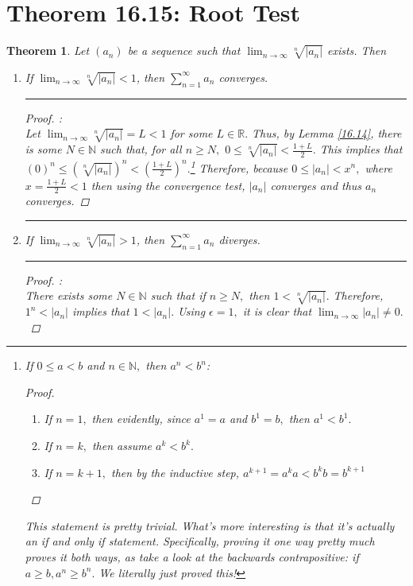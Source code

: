 \documentclass[openany, amssymb, psamsfonts]{amsart}
\newcommand{\bbN}{\mathbb{N}}
\newcommand{\bbR}{\mathbb{R}}
\newcommand{\abs}[1]{\lvert #1 \rvert}
\newtheorem{thm}{Theorem}[section]
\theoremstyle{definition}
\numberwithin{equation}{section}
\begin{document}
\section*{Theorem 16.15: Root Test}
\begin{thm}
\label{16.15}
	Let $(a_n)$ be a sequence such that $\displaystyle\lim_{n \to \infty} \sqrt[n]{\abs{a_n}}$ exists.  Then
	\begin{enumerate}
		\item[a)] If $\displaystyle\lim_{n \to \infty} \sqrt[n]{\abs{a_n}} < 1$,
		then $\displaystyle\sum_{n = 1}^{\infty} a_n$ converges.
\vspace{4pt}     \hrule   \vspace{4pt}\begin{proof}:\\
Let $\displaystyle\lim_{n\to\infty} \sqrt[n]{\abs{a_n}}= L <1$ for some $L \in \bbR.$ Thus, by Lemma \ref{16.14}, there is some $N \in \bbN$ such that, for all $n\geq N,$ $0\leq \sqrt[n]{\abs{a_n}} < \frac{1+L}{2}.$ This implies that $(0)^n \leq (\sqrt[n]{\abs{a_n}})^n < (\frac{1+L}{2})^n.$\footnote{If $0\leq a<b$ and $n \in \bbN,$ then $a^n<b^n$: 
\begin{proof}
\begin{enumerate}
    \item If $n = 1,$ then evidently, since $a^1 = a$ and $b^1 = b,$ then $a^1<b^1.$
    \item If $n = k,$ then assume $a^k < b^k.$
    \item If $n = k+1,$ then by the inductive step, $a^{k+1} = a^ka<b^kb = b^{k+1}$
\end{enumerate}
\end{proof} This statement is pretty trivial. What's more interesting is that it's actually an if and only if statement. Specifically, proving it one way pretty much proves it both ways, as take a look at the backwards contrapositive: if $a\geq b,a^n\geq b^n.$ We literally just proved this!} Therefore, because $0\leq |a_n|< x^n,$ where $x = \frac{1+L}{2}<1$ then using the convergence test, $|a_n|$ converges and thus $a_n$ converges. 
\end{proof}\vspace{4pt}     \hrule   \vspace{4pt}
		\item[b)] If $
		\displaystyle\lim_{n \to \infty} \sqrt[n]{\abs{a_n}} > 1$,
		then $\displaystyle\sum_{n = 1}^{\infty} a_n$ diverges.
\vspace{4pt}     \hrule   \vspace{4pt}\begin{proof}:\\
    There exists some $N \in \bbN$ such that if $n\geq N,$ then $1< \sqrt[n]{\abs{a_n}}.$ Therefore, $1^n < \abs{a_n}$ implies that $1< \abs {a_n}.$ Using $\epsilon = 1,$ it is clear that $\displaystyle\lim_{n\to \infty}|a_n|\neq 0.$
\end{proof}
	\end{enumerate}
\end{thm}
\end{document}
